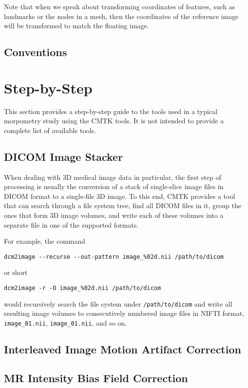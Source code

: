\documentclass{InsightArticle}
\begin{document}
Note that when we speak about transforming coordinates of features, such as
landmarks or the nodes in a mesh, then the coordinates of the reference image
will be transformed to match the floating image.

\subsection{Conventions}

\section{Step-by-Step}

This section provides a step-by-step guide to the tools used in a typical
morpometry study using the CMTK tools. It is not intended to provide a
complete list of available tools.

\subsection{DICOM Image Stacker}

When dealing with 3D medical image data in particular, the first step of
processing is usually the conversion of a stack of single-slice image files in
DICOM format to a single-file 3D image. To this end, CMTK provides a tool that
can search through a file system tree, find all DICOM files in it, group the
ones that form 3D image volumes, and write each of these volumes into a
separate file in one of the supported formats.

For example, the command
\begin{verbatim}
dcm2image --recurse --out-pattern image_%02d.nii /path/to/dicom
\end{verbatim}
or short
\begin{verbatim}
dcm2image -r -O image_%02d.nii /path/to/dicom
\end{verbatim}
would recursively search the file system under {\tt /path/to/dicom} and write
all resulting image volumes to consecutively numbered image files in NIFTI
format, {\tt image\_01.nii},  {\tt image\_01.nii}, and so on.

\subsection{Interleaved Image Motion Artifact Correction}

\subsection{MR Intensity Bias Field Correction}
\end{document}
